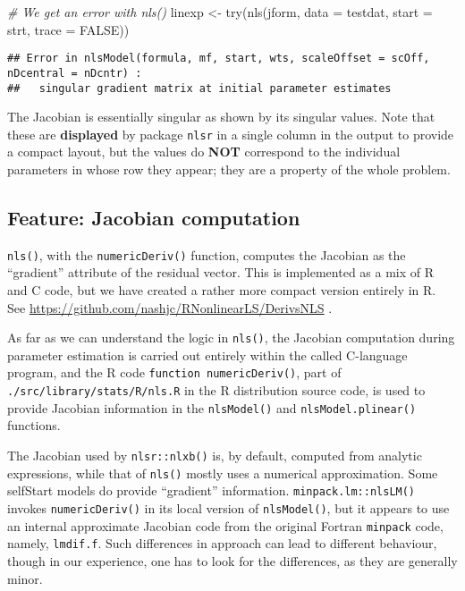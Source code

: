 \documentclass[
]{article}
\newenvironment{Shaded}{\begin{snugshade}}{\end{snugshade}}
\newcommand{\AttributeTok}[1]{\textcolor[rgb]{0.77,0.63,0.00}{#1}}
\newcommand{\CommentTok}[1]{\textcolor[rgb]{0.56,0.35,0.01}{\textit{#1}}}
\newcommand{\ConstantTok}[1]{\textcolor[rgb]{0.00,0.00,0.00}{#1}}
\newcommand{\FunctionTok}[1]{\textcolor[rgb]{0.00,0.00,0.00}{#1}}
\newcommand{\NormalTok}[1]{#1}
\newcommand{\OtherTok}[1]{\textcolor[rgb]{0.56,0.35,0.01}{#1}}
\begin{document}
\begin{Shaded}
\begin{Highlighting}[]
\CommentTok{\# We get an error with nls()}
\NormalTok{linexp }\OtherTok{\textless{}{-}} \FunctionTok{try}\NormalTok{(}\FunctionTok{nls}\NormalTok{(jform, }\AttributeTok{data =}\NormalTok{ testdat, }\AttributeTok{start =}\NormalTok{ strt, }\AttributeTok{trace =} \ConstantTok{FALSE}\NormalTok{))}
\end{Highlighting}
\end{Shaded}

\begin{verbatim}
## Error in nlsModel(formula, mf, start, wts, scaleOffset = scOff, nDcentral = nDcntr) : 
##   singular gradient matrix at initial parameter estimates
\end{verbatim}

The Jacobian is essentially singular as shown by its singular values.
Note that these are \textbf{displayed} by package \texttt{nlsr} in a
single column in the output to provide a compact layout, but the values
do \textbf{NOT} correspond to the individual parameters in whose row
they appear; they are a property of the whole problem.

\hypertarget{feature-jacobian-computation}{%
\subsection{Feature: Jacobian
computation}\label{feature-jacobian-computation}}

\texttt{nls()}, with the \texttt{numericDeriv()} function, computes the
Jacobian as the ``gradient'' attribute of the residual vector. This is
implemented as a mix of R and C code, but we have created a rather more
compact version entirely in R. See
\url{https://github.com/nashjc/RNonlinearLS/DerivsNLS} .

As far as we can understand the logic in \texttt{nls()}, the Jacobian
computation during parameter estimation is carried out entirely within
the called C-language program, and the R code
\texttt{function\ numericDeriv()}, part of
\texttt{./src/library/stats/R/nls.R} in the R distribution source code,
is used to provide Jacobian information in the \texttt{nlsModel()} and
\texttt{nlsModel.plinear()} functions.

The Jacobian used by \texttt{nlsr::nlxb()} is, by default, computed from
analytic expressions, while that of \texttt{nls()} mostly uses a
numerical approximation. Some selfStart models do provide ``gradient''
information. \texttt{minpack.lm::nlsLM()} invokes
\texttt{numericDeriv()} in its local version of \texttt{nlsModel()}, but
it appears to use an internal approximate Jacobian code from the
original Fortran \texttt{minpack} code, namely, \texttt{lmdif.f}. Such
differences in approach can lead to different behaviour, though in our
experience, one has to look for the differences, as they are generally
minor.
\end{document}
